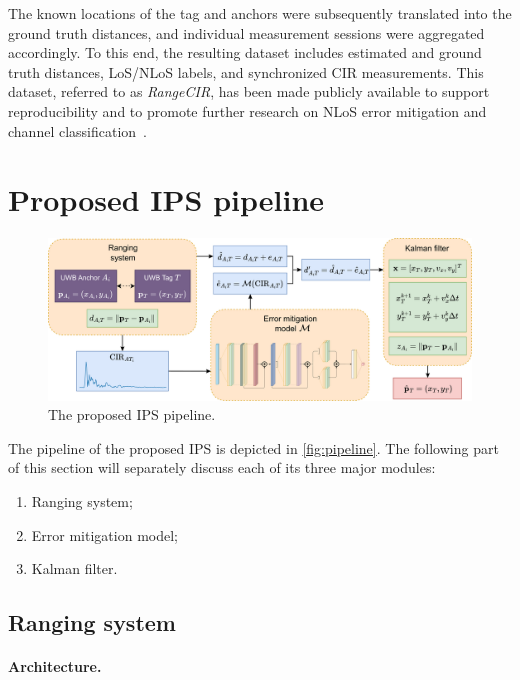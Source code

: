 The known locations of the tag and anchors were subsequently translated into the ground truth distances, and individual measurement sessions were aggregated accordingly. To this end, the resulting dataset includes estimated and ground truth distances, LoS/NLoS labels, and synchronized CIR measurements. This dataset, referred to as \textit{RangeCIR}, has been made publicly available to support reproducibility and to promote further research on NLoS error mitigation and channel classification~\cite{yaroshevych_2025_rangecir}.

\section{Proposed IPS pipeline}

\begin{figure}[tbh]
\includegraphics[width=\textwidth]{Figures/methodology/pipeline.pdf}
\centering
\caption{The proposed IPS pipeline.}
\label{fig:pipeline}
\end{figure}

The pipeline of the proposed IPS is depicted in \autoref{fig:pipeline}. The following part of this section will separately discuss each of its three major modules: 

\begin{enumerate}
    \item Ranging system;
    \item Error mitigation model;
    \item Kalman filter.
\end{enumerate}

\subsection{Ranging system}\label{ranging_system}

\paragraph{Architecture.}

